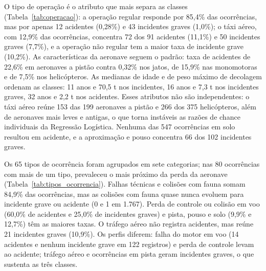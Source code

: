 \documentclass[12pt]{article}
\begin{document}
O tipo de operação é o atributo que mais separa as classes (Tabela~\ref{tab:operacao}): a operação regular responde por 85,4\% das ocorrências, mas por apenas 12 acidentes (0,28\%) e 43 incidentes graves (1,0\%); o táxi aéreo, com 12,9\% das ocorrências, concentra 72 dos 91 acidentes (11,1\%) e 50 incidentes graves (7,7\%), e a operação não regular tem a maior taxa de incidente grave (10,2\%). As características da aeronave seguem o padrão: taxa de acidentes de 22,6\% em aeronaves a pistão contra 0,32\% nos jatos, de 15,9\% nas monomotoras e de 7,5\% nos helicópteros. As medianas de idade e de peso máximo de decolagem ordenam as classes: 11 anos e 70,5 t nos incidentes, 16 anos e 7,3 t nos incidentes graves, 32 anos e 2,2 t nos acidentes. Esses atributos não são independentes: o táxi aéreo reúne 153 das 199 aeronaves a pistão e 266 dos 375 helicópteros, além de aeronaves mais leves e antigas, o que torna instáveis as razões de chance individuais da Regressão Logística. Nenhuma das 547 ocorrências em solo resultou em acidente, e a aproximação e pouso concentra 66 dos 102 incidentes graves.

\begin{table}[htbp]
    \centering
    \caption{Incidentes graves e acidentes por tipo de operação e tipo de motor}
    \vspace{0.05cm}
    \footnotesize\setlength{\tabcolsep}{5pt}\renewcommand{\arraystretch}{0.88}
    
    \label{tab:operacao}
\end{table}

Os 65 tipos de ocorrência foram agrupados em sete categorias; nas 80 ocorrências com mais de um tipo, prevaleceu o mais próximo da perda da aeronave (Tabela~\ref{tab:tipos_ocorrencia}). Falhas técnicas e colisões com fauna somam 84,9\% das ocorrências, mas as colisões com fauna quase nunca evoluem para incidente grave ou acidente (0 e 1 em 1.767). Perda de controle ou colisão em voo (60,0\% de acidentes e 25,0\% de incidentes graves) e pista, pouso e solo (9,9\% e 12,7\%) têm as maiores taxas. O tráfego aéreo não registra acidentes, mas reúne 21 incidentes graves (10,9\%). Os perfis diferem: falha do motor em voo (14 acidentes e nenhum incidente grave em 122 registros) e perda de controle levam ao acidente; tráfego aéreo e ocorrências em pista geram incidentes graves, o que sustenta as três classes.

\begin{table}[htbp]
    \centering
    \caption{Ocorrências, incidentes graves e acidentes por categoria de tipo}
    \vspace{0.05cm}
    \footnotesize\setlength{\tabcolsep}{3pt}\renewcommand{\arraystretch}{0.88}
    
    \label{tab:tipos_ocorrencia}
\end{table}
\end{document}
